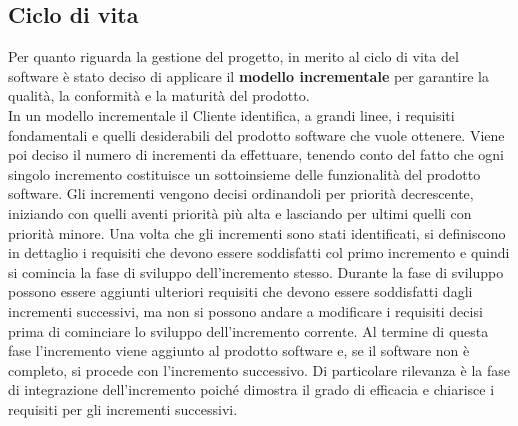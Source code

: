 \subsection{Ciclo di vita}
Per quanto riguarda la gestione del progetto, in merito al ciclo di vita del software è stato deciso di applicare il \textbf{modello incrementale} per garantire la qualità, la conformità e la maturità del prodotto. \\
In un modello incrementale il Cliente identifica, a grandi linee, i requisiti fondamentali e quelli desiderabili del prodotto software che vuole ottenere. Viene poi deciso il numero di incrementi da effettuare, tenendo conto del fatto che ogni singolo incremento costituisce un sottoinsieme delle funzionalità del prodotto software. Gli incrementi vengono decisi ordinandoli per priorità decrescente, iniziando con quelli aventi priorità più alta e lasciando per ultimi quelli con priorità minore. Una volta che gli incrementi sono stati identificati, si definiscono in dettaglio i requisiti che devono essere soddisfatti col primo incremento e quindi si comincia la fase di sviluppo dell'incremento stesso. Durante la fase di sviluppo possono essere aggiunti ulteriori requisiti che devono essere soddisfatti dagli incrementi successivi, ma non si possono andare a modificare i requisiti decisi prima di cominciare lo sviluppo dell'incremento corrente. Al termine di questa fase l'incremento viene aggiunto al prodotto software e, se il software non è completo, si procede con l'incremento successivo. Di particolare rilevanza è la fase di integrazione dell'incremento poiché dimostra il grado di efficacia e chiarisce i requisiti per gli incrementi successivi.
